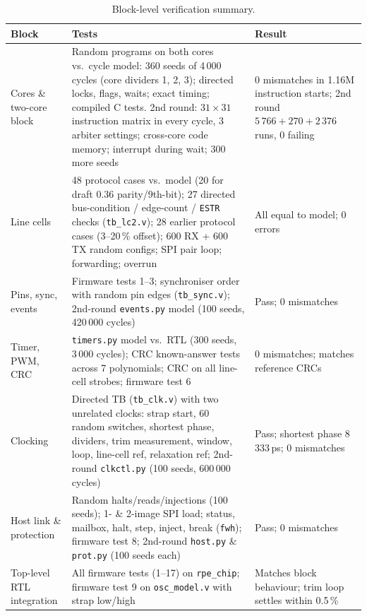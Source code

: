 \documentclass[10pt,a4paper]{article}
\begin{document}
\begin{table}[H]
\centering\small
\begin{tabularx}{\linewidth}{@{}lLL@{}}
\toprule
Block & Tests & Result \\
\midrule
Cores \& two-core block & Random programs on both cores vs.\ cycle model: 360 seeds of 4\,000 cycles (core dividers 1, 2, 3); directed locks, flags, waits; exact timing; compiled C tests. 2nd round: $31\times 31$ instruction matrix in every cycle, 3 arbiter settings; cross-core code memory; interrupt during wait; 300 more seeds & 0 mismatches in 1.16M instruction starts; 2nd round $5\,766 + 270 + 2\,376$ runs, 0 failing \\
Line cells & 48 protocol cases vs.\ model (20 for draft 0.36 parity/9th-bit); 27 directed bus-condition / edge-count / \texttt{ESTR} checks (\texttt{tb\_lc2.v}); 28 earlier protocol cases (3--20\,\% offset); 600 RX + 600 TX random configs; SPI pair loop; forwarding; overrun & All equal to model; 0 errors \\
Pins, sync, events & Firmware tests 1--3; synchroniser order with random pin edges (\texttt{tb\_sync.v}); 2nd-round \texttt{events.py} model (100 seeds, 420\,000 cycles) & Pass; 0 mismatches \\
Timer, PWM, CRC & \texttt{timers.py} model vs.\ RTL (300 seeds, 3\,000 cycles); CRC known-answer tests across 7 polynomials; CRC on all line-cell strobes; firmware test 6 & 0 mismatches; matches reference CRCs \\
Clocking & Directed TB (\texttt{tb\_clk.v}) with two unrelated clocks: strap start, 60 random switches, shortest phase, dividers, trim measurement, window, loop, line-cell ref, relaxation ref; 2nd-round \texttt{clkctl.py} (100 seeds, 600\,000 cycles) & Pass; shortest phase 8\,333\,ps; 0 mismatches \\
Host link \& protection & Random halts/reads/injections (100 seeds); 1- \& 2-image SPI load; status, mailbox, halt, step, inject, break (\texttt{fwh}); firmware test 8; 2nd-round \texttt{host.py} \& \texttt{prot.py} (100 seeds each) & Pass; 0 mismatches \\
Top-level RTL integration & All firmware tests (1--17) on \texttt{rpe\_chip}; firmware test 9 on \texttt{osc\_model.v} with strap low/high & Matches block behaviour; trim loop settles within 0.5\,\% \\
\bottomrule
\end{tabularx}
\caption{Block-level verification summary.}
\end{table}
\end{document}
